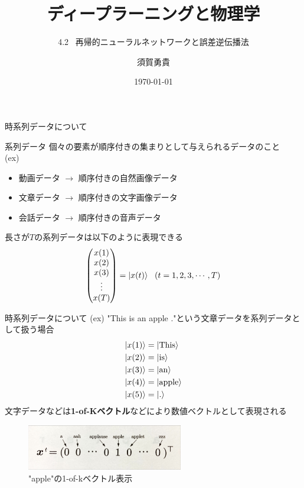 \documentclass[dvipdfmx,10pt]{beamer}
\title{ディープラーニングと物理学}
\subtitle{4.2 \ 再帰的ニューラルネットワークと誤差逆伝播法}
\author[須賀]{須賀勇貴}
\institute[茨大]{茨城大学大学院 \ 理工学研究科 \ 量子線科学専攻 \ 2年}
\date{\today}
\begin{document}
\frame{\maketitle}

  \begin{frame}{時系列データについて}
    \begin{block}{系列データ}
      個々の要素が順序付きの集まりとして与えられるデータのこと\\
      (ex) 
      \begin{itemize}
        \item 動画データ $\rightarrow$ 順序付きの自然画像データ
        \item 文章データ $\rightarrow$ 順序付きの文字画像データ
        \item 会話データ $\rightarrow$ 順序付きの音声データ
      \end{itemize}
    \end{block}
    長さが$T$の系列データは以下のように表現できる
      \begin{equation*}
        \begin{pmatrix*}
          x(1) \\ x(2) \\ x(3) \\ \vdots \\ x(T)
        \end{pmatrix*}
        =\ket{x(t)} \ \ (t=1,2,3,\cdots,T)
      \end{equation*}  
  \end{frame}

  \begin{frame}{時系列データについて}
    (ex) "This is an apple ."という文章データを系列データとして扱う場合
    \begin{align*}
      \ket{x(1)} &= \ket{\text{This}}\\
      \ket{x(2)} &= \ket{\text{is}}\\
      \ket{x(3)} &= \ket{\text{an}}\\
      \ket{x(4)} &= \ket{\text{apple}}\\
      \ket{x(5)} &= \ket{\text{.}}
    \end{align*}
    文字データなどは\textbf{1-of-Kベクトル}などにより数値ベクトルとして表現される
    \begin{figure}
      \begin{center}
        \includegraphics[height=2cm]{apple_vector.jpeg}
      \end{center} 
      \caption{"apple"の1-of-kベクトル表示}  
    \end{figure}
  \end{frame}
\end{document}
